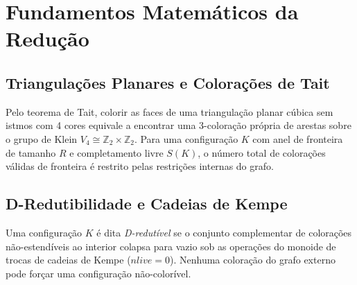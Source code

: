 \documentclass[11pt,a4paper]{article}
\begin{document}
\begin{table}[h!]
\centering
{}
\caption{Comparativo histórico dos conjuntos inevitáveis propostos na literatura para o Teorema das Quatro Cores.}
\end{table}

\section{Fundamentos Matemáticos da Redução}

\subsection{Triangulações Planares e Colorações de Tait}
Pelo teorema de Tait, colorir as faces de uma triangulação planar cúbica sem istmos com 4 cores equivale a encontrar uma 3-coloração própria de arestas sobre o grupo de Klein $V_4 \cong \mathbb{Z}_2 \times \mathbb{Z}_2$. Para uma configuração $K$ com anel de fronteira de tamanho $R$ e completamento livre $S(K)$, o número total de colorações válidas de fronteira é restrito pelas restrições internas do grafo.

\subsection{D-Redutibilidade e Cadeias de Kempe}
Uma configuração $K$ é dita \emph{D-redutível} se o conjunto complementar de colorações não-estendíveis ao interior colapsa para vazio sob as operações do monoide de trocas de cadeias de Kempe ($nlive = 0$). Nenhuma coloração do grafo externo pode forçar uma configuração não-colorível.
\end{document}
